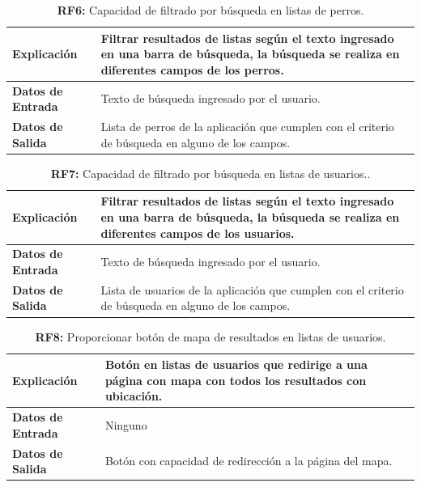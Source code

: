 \documentclass[a4paper, 12pt]{article}
\begin{document}
\begin{table}[H]
\captionsetup{justification=raggedright,singlelinecheck=false}
\caption{\textbf{RF6:} Capacidad de filtrado por búsqueda en listas de perros.}
\label{tab:RF6}
	\begin{tabular}{|m{5cm}|m{10cm}|}
	\hline
	\textbf{Explicación} & Filtrar resultados de listas según el texto ingresado en una barra de búsqueda, la búsqueda se realiza en diferentes campos de los perros. \\ 
	\hline
	\textbf{Datos de Entrada} & Texto de búsqueda ingresado por el usuario. \\ 
	\hline
	\textbf{Datos de Salida} &  Lista de perros de la aplicación que cumplen con el criterio de búsqueda en alguno de los campos. \\ 
	\hline
\end{tabular}
\end{table}

\begin{table}[H]
\captionsetup{justification=raggedright,singlelinecheck=false}
\caption{\textbf{RF7:} Capacidad de filtrado por búsqueda en listas de usuarios..}
\label{tab:RF7}
	\begin{tabular}{|m{5cm}|m{10cm}|}
\hline
	\textbf{Explicación} & Filtrar resultados de listas según el texto ingresado en una barra de búsqueda, la búsqueda se realiza en diferentes campos de los usuarios. \\ 
	\hline
	\textbf{Datos de Entrada} & Texto de búsqueda ingresado por el usuario. \\ 
	\hline
	\textbf{Datos de Salida} &  Lista de usuarios de la aplicación que cumplen con el criterio de búsqueda en alguno de los campos. \\ 
	\hline
\end{tabular}
\end{table}

\begin{table}[H]
\captionsetup{justification=raggedright,singlelinecheck=false}
\caption{\textbf{RF8:}  Proporcionar botón de mapa de resultados en listas de usuarios.}
\label{tab:RF8}
	\begin{tabular}{|m{5cm}|m{10cm}|}
	\hline
	\textbf{Explicación} & Botón en listas de usuarios que redirige a una página con mapa con todos los resultados con ubicación. \\ 
	\hline
	\textbf{Datos de Entrada} & Ninguno \\ 
	\hline
	\textbf{Datos de Salida} & Botón con capacidad de redirección a la página del mapa. \\ 
	\hline
\end{tabular}
\end{table}
\end{document}
